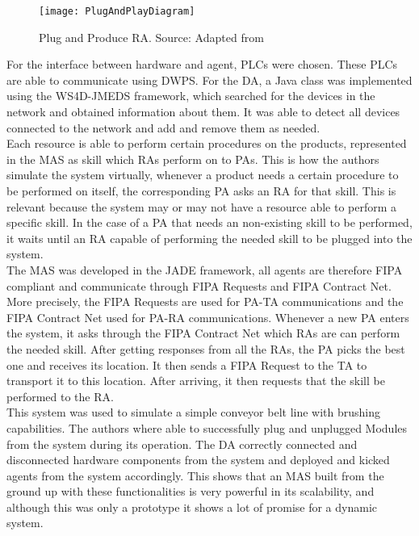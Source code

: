 \begin{figure}[h!]
	\centering
	\texttt{[image: PlugAndPlayDiagram]}
	\caption{Plug and Produce \gls{RA}. Source: Adapted from \cite{8972169}}
	\label{fig:plug_and_play_device_architecture}
\end{figure}

For the interface between hardware and agent, \gls{PLC}s were chosen. These \gls{PLC}s are able to communicate using \gls{DWPS}. For the \gls{DA}, a Java class was implemented using the \gls{WS4D-JMEDS} framework, which searched for the devices in the network and obtained information about them. It was able to detect all devices connected to the network and add and remove them as needed.\\

Each resource is able to perform certain procedures on the products, represented in the \gls{MAS} as skill which \gls{RA}s perform on to \gls{PA}s. This is how the authors simulate the system virtually, whenever a product needs a certain procedure to be performed on itself, the corresponding \gls{PA} asks an \gls{RA} for that skill. This is relevant because the system may or may not have a resource able to perform a specific skill. In the case of a \gls{PA} that needs an non-existing skill to be performed, it waits until an \gls{RA} capable of performing the needed skill to be plugged into the system.\\

The \gls{MAS} was developed in the \gls{JADE} framework, all agents are therefore \gls{FIPA} compliant and communicate through \gls{FIPA} Requests and \gls{FIPA} Contract Net. More precisely, the \gls{FIPA} Requests are used for \gls{PA}-\gls{TA} communications and the \gls{FIPA} Contract Net used for \gls{PA}-\gls{RA} communications. Whenever a new \gls{PA} enters the system, it asks through the \gls{FIPA} Contract Net which \gls{RA}s are can perform the needed skill. After getting responses from all the \gls{RA}s, the \gls{PA} picks the best one and receives its location. It then sends a \gls{FIPA} Request to the \gls{TA} to transport it to this location. After arriving, it then requests that the skill be performed to the \gls{RA}.\\

This system was used to simulate a simple conveyor belt line with brushing capabilities. The authors where able to successfully plug and unplugged Modules from the system during its operation. The \gls{DA} correctly connected and disconnected hardware components from the system and deployed and kicked agents from the system accordingly. This shows that an \gls{MAS} built from the ground up with these functionalities is very powerful in its scalability, and although this was only a prototype it shows a lot of promise for a dynamic system.

